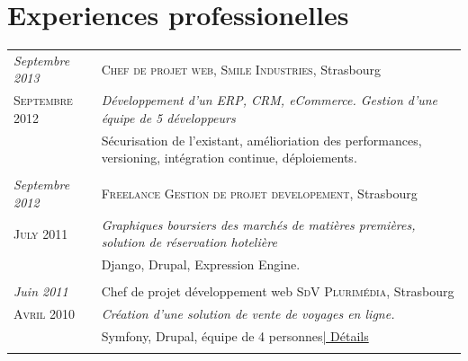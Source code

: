 \documentclass[a4paper,10pt]{article}
\begin{document}
\section{Experiences professionelles}
\begin{tabular}{p{}|p{}}	

	\emph{Septembre 2013} & \textsc{Chef de projet web, Smile Industries}, Strasbourg \\\textsc{Septembre 2012}&\emph{Développement d'un ERP, CRM, eCommerce. Gestion d'une équipe de 5 développeurs}\\&\footnotesize{Sécurisation de l'existant, amélioriation des performances, versioning, intégration continue, déploiements.}\\\multicolumn{2}{c}{} \\

	\emph{Septembre 2012} & \textsc{Freelance Gestion de projet developement}, Strasbourg \\\textsc{July 2011}&\emph{Graphiques boursiers des marchés de matières premières, solution de réservation hotelière}\\&\footnotesize{Django, Drupal, Expression Engine.}\\\multicolumn{2}{c}{} \\

\emph{Juin 2011} & Chef de projet développement web \textsc{SdV Plurimédia}, Strasbourg \\\textsc{Avril 2010}&\emph{Création d'une solution de vente de voyages en ligne.}\\&\footnotesize{Symfony, Drupal, équipe de 4 personnes\hyperlink{sdv}{\hfill | \footnotesize Détails}}\\\multicolumn{2}{c}{} \\
  

\end{tabular}
\end{document}
